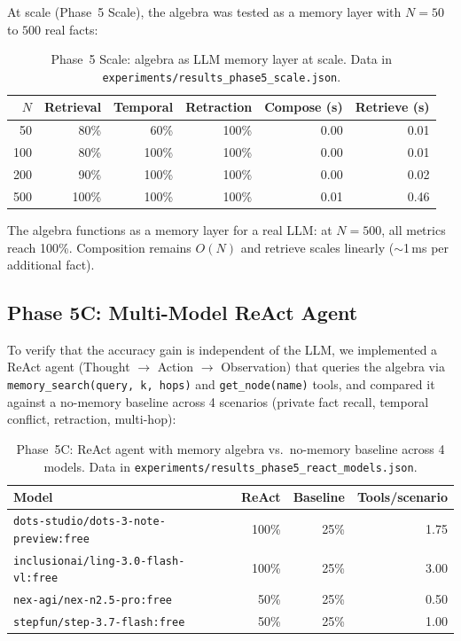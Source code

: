 \documentclass[11pt,a4paper]{article}
\theoremstyle{definition}
\begin{document}
At scale (Phase~5 Scale), the algebra was tested as a memory layer with $N = 50$ to $500$ real facts:

\begin{table}[h]
\centering
\begin{tabular}{rrrrrr}
\toprule
$N$ & Retrieval & Temporal & Retraction & Compose (s) & Retrieve (s) \\
\midrule
50 & 80\% & 60\% & 100\% & 0.00 & 0.01 \\
100 & 80\% & 100\% & 100\% & 0.00 & 0.01 \\
200 & 90\% & 100\% & 100\% & 0.00 & 0.02 \\
500 & 100\% & 100\% & 100\% & 0.01 & 0.46 \\
\bottomrule
\end{tabular}
\caption{Phase~5 Scale: algebra as LLM memory layer at scale. Data in \texttt{experiments/results\_phase5\_scale.json}.}
\end{table}

The algebra functions as a memory layer for a real LLM: at $N = 500$, all metrics reach 100\%. Composition remains $O(N)$ and retrieve scales linearly ($\sim$1\,ms per additional fact).

\subsection{Phase 5C: Multi-Model ReAct Agent}

To verify that the accuracy gain is independent of the LLM, we implemented a ReAct agent (Thought $\to$ Action $\to$ Observation) that queries the algebra via \texttt{memory\_search(query, k, hops)} and \texttt{get\_node(name)} tools, and compared it against a no-memory baseline across 4 scenarios (private fact recall, temporal conflict, retraction, multi-hop):

\begin{table}[h]
\centering
\begin{tabular}{lrrr}
\toprule
\textbf{Model} & \textbf{ReAct} & \textbf{Baseline} & \textbf{Tools/scenario} \\
\midrule
\texttt{dots-studio/dots-3-note-preview:free} & 100\% & 25\% & 1.75 \\
\texttt{inclusionai/ling-3.0-flash-vl:free} & 100\% & 25\% & 3.00 \\
\texttt{nex-agi/nex-n2.5-pro:free} & 50\% & 25\% & 0.50 \\
\texttt{stepfun/step-3.7-flash:free} & 50\% & 25\% & 1.00 \\
\bottomrule
\end{tabular}
\caption{Phase~5C: ReAct agent with memory algebra vs.\ no-memory baseline across 4 models. Data in \texttt{experiments/results\_phase5\_react\_models.json}.}
\end{table}
\end{document}

